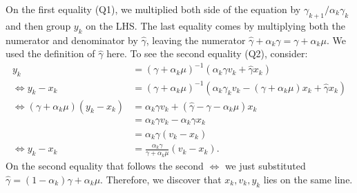 \documentclass[12pt]{article}
\begin{document}
        On the first equality (Q1), we multiplied both side of the equation by $\gamma_{k + 1}/\alpha_k \gamma_k$ and then group $y_k$ on the LHS. 
        The last equality comes by multiplying both the numerator and denominator by $\hat \gamma$, leaving the numerator $\hat \gamma + \alpha_k \gamma = \gamma + \alpha_k \mu$. 
        We used the definition of $\hat \gamma$ here. 
        To see the second equality (Q2), consider: 
        \begin{align*}
            y_k &= (\gamma + \alpha_k \mu)^{-1}(\alpha_k \gamma v_k + \hat\gamma x_k)
            \\
            \iff
            y_k - x_k &= 
            (\gamma + \alpha_k \mu)^{-1}
            (\alpha_k \gamma_k v_k - (\gamma + \alpha_k \mu)x_k + \hat \gamma x_k)
            \\
            \iff 
            (\gamma + \alpha_k \mu)(y_k - x_k)
            &= 
            \alpha_k\gamma v_k + 
            (\hat \gamma - \gamma - \alpha_k \mu) x_k
            \\
            &= \alpha_k \gamma v_k - \alpha_k \gamma x_k 
            \\
            &= \alpha_k \gamma(v_k - x_k)
            \\
            \iff 
            y_k - x_k &= 
            \frac{\alpha_k \gamma}{\gamma + \alpha_k \mu}(v_k - x_k). 
        \end{align*}
        On the second equality that follows the second $\iff$ we just substituted $\hat\gamma = (1 - \alpha_k)\gamma + \alpha_k \mu$. 
        Therefore, we discover that $x_k, v_k, y_k$ lies on the same line. 
    
\end{document}
